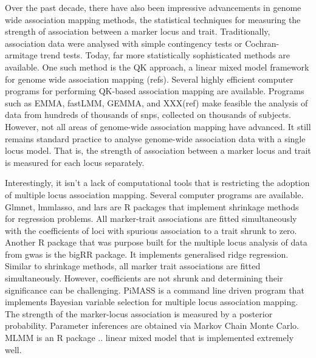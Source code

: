 \documentclass{article}
\begin{document}
Over the past decade, there have also been impressive advancements in genome wide association mapping methods, the statistical techniques for measuring the strength of association between a marker locus and trait. Traditionally, association data were analysed with simple contingency tests or Cochran-armitage  trend tests. Today, far more statistically sophisticated methods are available. One such method is the  QK approach, a linear mixed model framework for genome wide association mapping (refs).  Several highly efficient 
computer programs for performing QK-based association mapping are available. Programs such as EMMA, fastLMM, GEMMA, and 
XXX(ref) make feasible the analysis of data from hundreds of thousands of snps, collected on thousands of subjects. However, not all 
areas of genome-wide association mapping have advanced. It still remains standard practice to analyse genome-wide association data with a single locus model. That is,  the strength of association between a marker locus and trait is measured 
for each locus separately. 


Interestingly, it isn't a lack of computational tools that is restricting the adoption of multiple locus association mapping.  Several  computer programs are available. Glmnet, lmmlasso, and lars are R packages that implement shrinkage methods for regression problems.   All marker-trait associations are fitted simultaneously with the coefficients of loci with spurious association to a trait shrunk to zero. Another R package that was purpose built for the multiple locus analysis of data from gwas is the bigRR package.  It implements generalised ridge regression. Similar to shrinkage methods, all marker trait associations are fitted simultaneously. However, coefficients are not shrunk and  determining their significance  can be challenging. PiMASS is a command line driven program that implements Bayesian variable selection for multiple locus association mapping. The strength of the marker-locus association is measured by a posterior probability. Parameter inferences are obtained via Markov Chain Monte Carlo.  MLMM is an R package .. linear mixed model that is implemented extremely well. 
\end{document}

